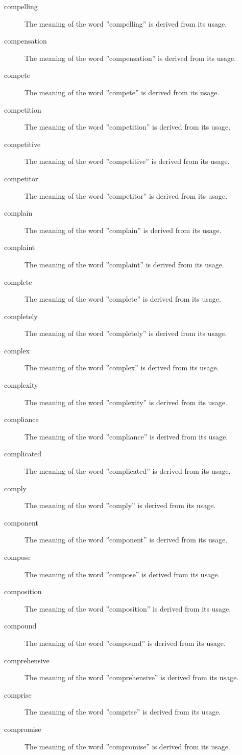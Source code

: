 \documentclass[12pt, letterpaper]{memoir}
\begin{document}
\begin{description}
\item[compelling] The meaning of the word ''compelling'' is derived from its usage.
\item[compensation] The meaning of the word ''compensation'' is derived from its usage.
\item[compete] The meaning of the word ''compete'' is derived from its usage.
\item[competition] The meaning of the word ''competition'' is derived from its usage.
\item[competitive] The meaning of the word ''competitive'' is derived from its usage.
\item[competitor] The meaning of the word ''competitor'' is derived from its usage.
\item[complain] The meaning of the word ''complain'' is derived from its usage.
\item[complaint] The meaning of the word ''complaint'' is derived from its usage.
\item[complete] The meaning of the word ''complete'' is derived from its usage.
\item[completely] The meaning of the word ''completely'' is derived from its usage.
\item[complex] The meaning of the word ''complex'' is derived from its usage.
\item[complexity] The meaning of the word ''complexity'' is derived from its usage.
\item[compliance] The meaning of the word ''compliance'' is derived from its usage.
\item[complicated] The meaning of the word ''complicated'' is derived from its usage.
\item[comply] The meaning of the word ''comply'' is derived from its usage.
\item[component] The meaning of the word ''component'' is derived from its usage.
\item[compose] The meaning of the word ''compose'' is derived from its usage.
\item[composition] The meaning of the word ''composition'' is derived from its usage.
\item[compound] The meaning of the word ''compound'' is derived from its usage.
\item[comprehensive] The meaning of the word ''comprehensive'' is derived from its usage.
\item[comprise] The meaning of the word ''comprise'' is derived from its usage.
\item[compromise] The meaning of the word ''compromise'' is derived from its usage.

\end{description}
\end{document}
